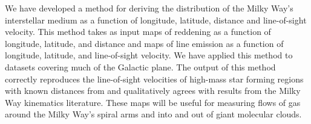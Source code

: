 
We have developed a method for deriving the distribution of the Milky Way's interstellar medium as a function of longitude, latitude, distance and line-of-sight velocity.
This method takes as input maps of reddening as a function of longitude, latitude, and distance and maps of line emission as a function of longitude, latitude, and line-of-sight velocity.
We have applied this method to datasets covering much of the Galactic plane.
The output of this method correctly reproduces the line-of-sight velocities of high-mass star forming regions with known distances from \citet{Reid:2014km} and qualitatively agrees with results from the Milky Way kinematics literature. 
These maps will be useful for measuring flows of gas around the Milky Way's spiral arms and into and out of giant molecular clouds.
